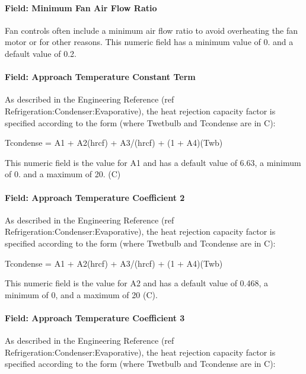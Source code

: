 \paragraph{Field: Minimum Fan Air Flow Ratio}\label{field-minimum-fan-air-flow-ratio-1}

Fan controls often include a minimum air flow ratio to avoid overheating the fan motor or for other reasons. This numeric field has a minimum value of 0. and a default value of 0.2.

\paragraph{Field: Approach Temperature Constant Term}\label{field-approach-temperature-constant-term}

As described in the Engineering Reference (ref Refrigeration:Condenser:Evaporative), the heat rejection capacity factor is specified according to the form (where Twetbulb and Tcondense are in C):

Tcondense = A1 + A2(hrcf) + A3/(hrcf) + (1 + A4)(Twb)

This numeric field is the value for A1 and has a default value of 6.63, a minimum of 0. and a maximum of 20. (C)

\paragraph{Field: Approach Temperature Coefficient 2}\label{field-approach-temperature-coefficient-2}

As described in the Engineering Reference (ref Refrigeration:Condenser:Evaporative), the heat rejection capacity factor is specified according to the form (where Twetbulb and Tcondense are in C):

Tcondense = A1 + A2(hrcf) + A3/(hrcf) + (1 + A4)(Twb)

This numeric field is the value for A2 and has a default value of 0.468, a minimum of 0, and a maximum of 20 (C).

\paragraph{Field: Approach Temperature Coefficient 3}\label{field-approach-temperature-coefficient-3}

As described in the Engineering Reference (ref Refrigeration:Condenser:Evaporative), the heat rejection capacity factor is specified according to the form (where Twetbulb and Tcondense are in C):

